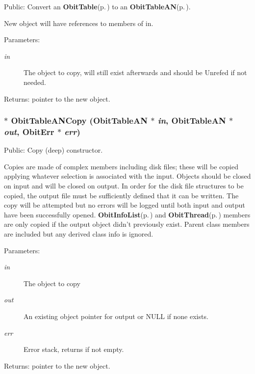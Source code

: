 Public: Convert an {\bf Obit\-Table}{\rm (p.\,\pageref{structObitTable})} to an {\bf Obit\-Table\-AN}{\rm (p.\,\pageref{structObitTableAN})}. 

New object will have references to members of in. \begin{Desc}
\item[Parameters:]
\begin{description}
\item[{\em in}]The object to copy, will still exist afterwards and should be Unrefed if not needed. \end{description}
\end{Desc}
\begin{Desc}
\item[Returns:]pointer to the new object. \end{Desc}
\subsubsection{$\ast$ Obit\-Table\-ANCopy ({\bf Obit\-Table\-AN} $\ast$ {\em in}, {\bf Obit\-Table\-AN} $\ast$ {\em out}, {\bf Obit\-Err} $\ast$ {\em err})}\label{ObitTableAN_8h_a14}


Public: Copy (deep) constructor. 

Copies are made of complex members including disk files; these will be copied applying whatever selection is associated with the input. Objects should be closed on input and will be closed on output. In order for the disk file structures to be copied, the output file must be sufficiently defined that it can be written. The copy will be attempted but no errors will be logged until both input and output have been successfully opened. {\bf Obit\-Info\-List}{\rm (p.\,\pageref{structObitInfoList})} and {\bf Obit\-Thread}{\rm (p.\,\pageref{structObitThread})} members are only copied if the output object didn't previously exist. Parent class members are included but any derived class info is ignored. \begin{Desc}
\item[Parameters:]
\begin{description}
\item[{\em in}]The object to copy \item[{\em out}]An existing object pointer for output or NULL if none exists. \item[{\em err}]Error stack, returns if not empty. \end{description}
\end{Desc}
\begin{Desc}
\item[Returns:]pointer to the new object. \end{Desc}
